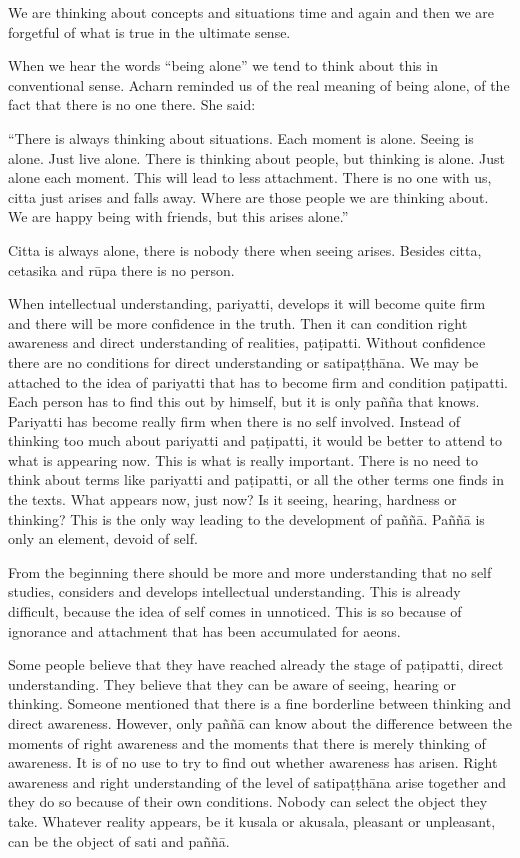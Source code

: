 We are thinking about concepts and situations time and again and then we
are forgetful of what is true in the ultimate sense.

When we hear the words ``being alone'' we tend to think about this in
conventional sense. Acharn reminded us of the real meaning of being
alone, of the fact that there is no one there. She said:

``There is always thinking about situations. Each moment is alone.
Seeing is alone. Just live alone. There is thinking about people, but
thinking is alone. Just alone each moment. This will lead to less
attachment. There is no one with us, citta just arises and falls away.
Where are those people we are thinking about. We are happy being with
friends, but this arises alone.''

Citta is always alone, there is nobody there when seeing arises. Besides
citta, cetasika and rūpa there is no person.

When intellectual understanding, pariyatti, develops it will become
quite firm and there will be more confidence in the truth. Then it can
condition right awareness and direct understanding of realities,
paṭipatti. Without confidence there are no conditions for direct
understanding or satipaṭṭhāna. We may be attached to the idea of
pariyatti that has to become firm and condition paṭipatti. Each person
has to find this out by himself, but it is only pañña that knows.
Pariyatti has become really firm when there is no self involved. Instead
of thinking too much about pariyatti and paṭipatti, it would be better
to attend to what is appearing now. This is what is really important.
There is no need to think about terms like pariyatti and paṭipatti, or
all the other terms one finds in the texts. What appears now, just now?
Is it seeing, hearing, hardness or thinking? This is the only way
leading to the development of paññā. Paññā is only an element, devoid of
self.

From the beginning there should be more and more understanding that no
self studies, considers and develops intellectual understanding. This is
already difficult, because the idea of self comes in unnoticed. This is
so because of ignorance and attachment that has been accumulated for
aeons.

Some people believe that they have reached already the stage of
paṭipatti, direct understanding. They believe that they can be aware of
seeing, hearing or thinking. Someone mentioned that there is a fine
borderline between thinking and direct awareness. However, only paññā
can know about the difference between the moments of right awareness and
the moments that there is merely thinking of awareness. It is of no use
to try to find out whether awareness has arisen. Right awareness and
right understanding of the level of satipaṭṭhāna arise together and they
do so because of their own conditions. Nobody can select the object they
take. Whatever reality appears, be it kusala or akusala, pleasant or
unpleasant, can be the object of sati and paññā.

